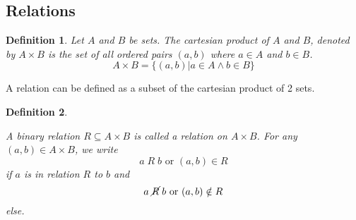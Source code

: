 \documentclass[12pt]{article}
\newtheorem{definition}{Definition} [section]
\begin{document}
\subsection{Relations}
\begin{definition} \emph{Let $A$ and $B$ be sets. The cartesian product of $A$ and $B$, denoted by $A\times B$ is the set of all ordered pairs $(a, b)$ where $a \in A$ and $b \in B$.}
\[A \times B = \{ (a, b) | a \in A \wedge b \in B \}\]
\end{definition}
A relation can be defined as a subset of the cartesian product of 2 sets.
\begin{definition}
\begin{em}
A binary relation $R \subseteq A \times B$ is called a relation on $A \times B$. For any $(a, b) \in A \times B$, we write
\[a \; R \; b \text{ or } (a, b) \in R\]
if $a$ is in relation $R$ to $b$ and
\[a \; \cancel{R} \; b \text{ or } (a, b) \notin R\]
else.
\end{em}
\end{definition}
\end{document}
